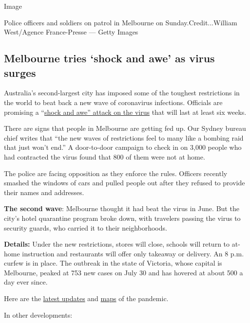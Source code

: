 Image

Police officers and soldiers on patrol in Melbourne on
Sunday.Credit...William West/Agence France-Presse --- Getty Images

\hypertarget{melbourne-tries-shock-and-awe-as-virus-surges}{%
\subsection{Melbourne tries `shock and awe' as virus
surges}\label{melbourne-tries-shock-and-awe-as-virus-surges}}

Australia's second-largest city has imposed some of the toughest
restrictions in the world to beat back a new wave of coronavirus
infections. Officials are promising a
``\href{https://www.nytimes.com/2020/08/04/world/australia/coronavirus-melbourne-lockdown.html}{shock
and awe'' attack on the virus} that will last at least six weeks.

There are signs that people in Melbourne are getting fed up. Our Sydney
bureau chief writes that ``the new waves of restrictions feel to many
like a bombing raid that just won't end.'' A door-to-door campaign to
check in on 3,000 people who had contracted the virus found that 800 of
them were not at home.

The police are facing opposition as they enforce the rules. Officers
recently smashed the windows of cars and pulled people out after they
refused to provide their names and addresses.

\textbf{The second wave}: Melbourne thought it had beat the virus in
June. But the city's hotel quarantine program broke down, with travelers
passing the virus to security guards, who carried it to their
neighborhoods.

\textbf{Details:} Under the new restrictions, stores will close, schools
will return to at-home instruction and restaurants will offer only
takeaway or delivery. An 8 p.m. curfew is in place. The outbreak in the
state of Victoria, whose capital is Melbourne, peaked at 753 new cases
on July 30 and has hovered at about 500 a day ever since.

Here are the
\href{https://www.nytimes.com/2020/08/04/world/coronavirus-covid-19.html?action=click\&module=Top\%20Stories\&pgtype=Homepage}{latest
updates} and
\href{https://www.nytimes.com/interactive/2020/world/coronavirus-maps.html}{maps}
of the pandemic.

In other developments:

